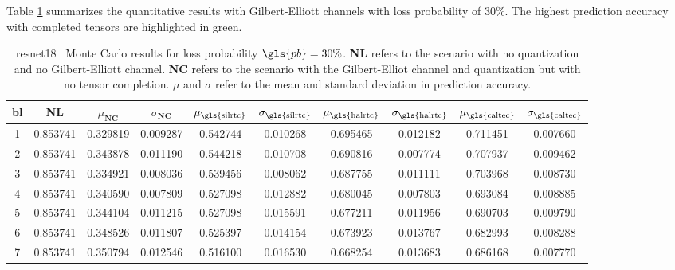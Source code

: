 Table \ref{table:expts:mc:0.3} summarizes the quantitative results with Gilbert-Elliott channels with loss probability of 30\%. The highest prediction accuracy with completed tensors are highlighted in green.

\begin{table}[H]
	\caption[ResNet18 Monte Carlo results with 30 \% loss probability]{\gls{resnet18} \addone~Monte Carlo results for loss probability $\gls{pb} = 30\%$. \textbf{NL} refers to the scenario with no quantization and no Gilbert-Elliott channel. \textbf{NC} refers to the scenario with the Gilbert-Elliot channel and quantization but with no tensor completion. $\mu$ and $\sigma$ refer to the mean and standard deviation in prediction accuracy.} \label{table:expts:mc:0.3}
	\centering
	\begin{adjustbox}{max width = \textwidth}
		\begin{tabular}{|c|c|cc|cc|cc|cc|}
			\hline
			\gls{bl} &  \textbf{NL} &  $\mu_{\textbf{NC}}$ &  $\sigma_{\textbf{NC}}$ &  $\mu_{\text{\gls{silrtc}}}$ &  $\sigma_{\text{\gls{silrtc}}}$ &  $\mu_{\text{\gls{halrtc}}}$ &  $\sigma_{\text{\gls{halrtc}}}$ &  $\mu_{\text{\gls{caltec}}}$ &  $\sigma_{\text{\gls{caltec}}}$ \\
			\hline \hline 
			1 &   0.853741 &             0.329819 &            0.009287 &     0.542744 &    0.010268 &     0.695465 &    0.012182 &    \cellcolor{green!25} 0.711451 &    0.007660 \\
			2 &   0.853741 &             0.343878 &            0.011190 &     0.544218 &    0.010708 &     0.690816 &    0.007774 &     \cellcolor{green!25}0.707937 &    0.009462 \\
			3 &   0.853741 &             0.334921 &            0.008036 &     0.539456 &    0.008062 &     0.687755 &    0.011111 &     \cellcolor{green!25} 0.703968 &    0.008730 \\
			4 &   0.853741 &             0.340590 &            0.007809 &     0.527098 &    0.012882 &     0.680045 &    0.007803 &     \cellcolor{green!25} 0.693084 &    0.008885 \\
			5 &   0.853741 &             0.344104 &            0.011215 &     0.527098 &    0.015591 &     0.677211 &    0.011956 &     \cellcolor{green!25} 0.690703 &    0.009790 \\
			6 &   0.853741 &             0.348526 &            0.011807 &     0.525397 &    0.014154 &     0.673923 &    0.013767 &     \cellcolor{green!25} 0.682993 &    0.008288 \\
			7 &   0.853741 &             0.350794 &            0.012546 &     0.516100 &    0.016530 &     0.668254 &    0.013683 &     \cellcolor{green!25} 0.686168 &    0.007770 \\
			\hline 
		\end{tabular}%
	\end{adjustbox}
\end{table}

